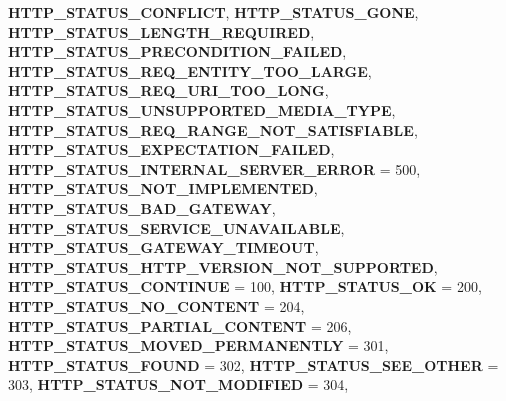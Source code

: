 \begin{DoxyCompactItemize}
{\bfseries H\+T\+T\+P\+\_\+\+S\+T\+A\+T\+U\+S\+\_\+\+C\+O\+N\+F\+L\+I\+CT}, 
\newline
{\bfseries H\+T\+T\+P\+\_\+\+S\+T\+A\+T\+U\+S\+\_\+\+G\+O\+NE}, 
{\bfseries H\+T\+T\+P\+\_\+\+S\+T\+A\+T\+U\+S\+\_\+\+L\+E\+N\+G\+T\+H\+\_\+\+R\+E\+Q\+U\+I\+R\+ED}, 
{\bfseries H\+T\+T\+P\+\_\+\+S\+T\+A\+T\+U\+S\+\_\+\+P\+R\+E\+C\+O\+N\+D\+I\+T\+I\+O\+N\+\_\+\+F\+A\+I\+L\+ED}, 
{\bfseries H\+T\+T\+P\+\_\+\+S\+T\+A\+T\+U\+S\+\_\+\+R\+E\+Q\+\_\+\+E\+N\+T\+I\+T\+Y\+\_\+\+T\+O\+O\+\_\+\+L\+A\+R\+GE}, 
\newline
{\bfseries H\+T\+T\+P\+\_\+\+S\+T\+A\+T\+U\+S\+\_\+\+R\+E\+Q\+\_\+\+U\+R\+I\+\_\+\+T\+O\+O\+\_\+\+L\+O\+NG}, 
{\bfseries H\+T\+T\+P\+\_\+\+S\+T\+A\+T\+U\+S\+\_\+\+U\+N\+S\+U\+P\+P\+O\+R\+T\+E\+D\+\_\+\+M\+E\+D\+I\+A\+\_\+\+T\+Y\+PE}, 
{\bfseries H\+T\+T\+P\+\_\+\+S\+T\+A\+T\+U\+S\+\_\+\+R\+E\+Q\+\_\+\+R\+A\+N\+G\+E\+\_\+\+N\+O\+T\+\_\+\+S\+A\+T\+I\+S\+F\+I\+A\+B\+LE}, 
{\bfseries H\+T\+T\+P\+\_\+\+S\+T\+A\+T\+U\+S\+\_\+\+E\+X\+P\+E\+C\+T\+A\+T\+I\+O\+N\+\_\+\+F\+A\+I\+L\+ED}, 
\newline
{\bfseries H\+T\+T\+P\+\_\+\+S\+T\+A\+T\+U\+S\+\_\+\+I\+N\+T\+E\+R\+N\+A\+L\+\_\+\+S\+E\+R\+V\+E\+R\+\_\+\+E\+R\+R\+OR} = 500, 
{\bfseries H\+T\+T\+P\+\_\+\+S\+T\+A\+T\+U\+S\+\_\+\+N\+O\+T\+\_\+\+I\+M\+P\+L\+E\+M\+E\+N\+T\+ED}, 
{\bfseries H\+T\+T\+P\+\_\+\+S\+T\+A\+T\+U\+S\+\_\+\+B\+A\+D\+\_\+\+G\+A\+T\+E\+W\+AY}, 
{\bfseries H\+T\+T\+P\+\_\+\+S\+T\+A\+T\+U\+S\+\_\+\+S\+E\+R\+V\+I\+C\+E\+\_\+\+U\+N\+A\+V\+A\+I\+L\+A\+B\+LE}, 
\newline
{\bfseries H\+T\+T\+P\+\_\+\+S\+T\+A\+T\+U\+S\+\_\+\+G\+A\+T\+E\+W\+A\+Y\+\_\+\+T\+I\+M\+E\+O\+UT}, 
{\bfseries H\+T\+T\+P\+\_\+\+S\+T\+A\+T\+U\+S\+\_\+\+H\+T\+T\+P\+\_\+\+V\+E\+R\+S\+I\+O\+N\+\_\+\+N\+O\+T\+\_\+\+S\+U\+P\+P\+O\+R\+T\+ED}, 
{\bfseries H\+T\+T\+P\+\_\+\+S\+T\+A\+T\+U\+S\+\_\+\+C\+O\+N\+T\+I\+N\+UE} = 100, 
{\bfseries H\+T\+T\+P\+\_\+\+S\+T\+A\+T\+U\+S\+\_\+\+OK} = 200, 
\newline
{\bfseries H\+T\+T\+P\+\_\+\+S\+T\+A\+T\+U\+S\+\_\+\+N\+O\+\_\+\+C\+O\+N\+T\+E\+NT} = 204, 
{\bfseries H\+T\+T\+P\+\_\+\+S\+T\+A\+T\+U\+S\+\_\+\+P\+A\+R\+T\+I\+A\+L\+\_\+\+C\+O\+N\+T\+E\+NT} = 206, 
{\bfseries H\+T\+T\+P\+\_\+\+S\+T\+A\+T\+U\+S\+\_\+\+M\+O\+V\+E\+D\+\_\+\+P\+E\+R\+M\+A\+N\+E\+N\+T\+LY} = 301, 
{\bfseries H\+T\+T\+P\+\_\+\+S\+T\+A\+T\+U\+S\+\_\+\+F\+O\+U\+ND} = 302, 
\newline
{\bfseries H\+T\+T\+P\+\_\+\+S\+T\+A\+T\+U\+S\+\_\+\+S\+E\+E\+\_\+\+O\+T\+H\+ER} = 303, 
{\bfseries H\+T\+T\+P\+\_\+\+S\+T\+A\+T\+U\+S\+\_\+\+N\+O\+T\+\_\+\+M\+O\+D\+I\+F\+I\+ED} = 304, 

\end{DoxyCompactItemize}
